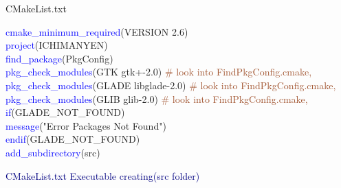 \documentclass[11pt]{sample}
\begin{document}
\begin{algorithm}
  \caption{CMakeList.txt}
  \begin{algorithmic}
\STATE\textcolor{Blue}{cmake\_minimum\_required}(VERSION 2.6)\\
\STATE\textcolor{Blue}{project}(ICHIMANYEN)\\
\STATE\textcolor{Blue}{find\_package}(PkgConfig)\\
\STATE\textcolor{Blue}{pkg\_check\_modules}(GTK gtk+-2.0)   \textcolor{Sienna}{ \# look into FindPkgConfig.cmake, }\\
\STATE\textcolor{Blue}{pkg\_check\_modules}(GLADE libglade-2.0)  \textcolor{Sienna}{  \# look into FindPkgConfig.cmake,}\\ 
\STATE\textcolor{Blue}{pkg\_check\_modules}(GLIB glib-2.0)  \textcolor{Sienna}{  \# look into FindPkgConfig.cmake,} \\
\STATE\textcolor{Blue}{if}(GLADE\_NOT\_FOUND)\\
\STATE\textcolor{Blue}{  message}("Error Packages Not Found")\\
\STATE\textcolor{Blue}{endif}(GLADE\_NOT\_FOUND)\\
\STATE\textcolor{Blue}{add\_subdirectory}(src) \\
 \end{algorithmic}
\end{algorithm}
\textcolor{Navy}{CMakeList.txt Executable creating(src folder)}
\end{document}
